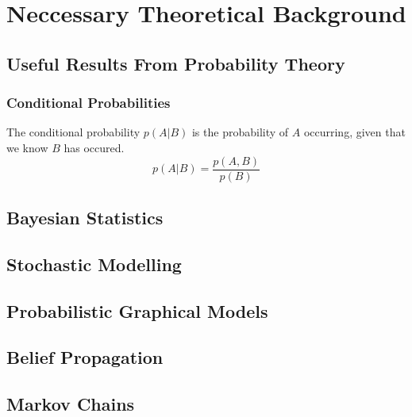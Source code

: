 \chapter{Neccessary Theoretical Background}

\section{Useful Results From Probability Theory}


 
\subsection{Conditional Probabilities}
The conditional probability $p(A | B)$ is the probability of $A$ occurring, given that we know $B$ has occured. 
\begin{equation}
    p(A | B) = \frac{p(A, B)}{p(B)}
\end{equation}



\section{Bayesian Statistics}

\section{Stochastic Modelling}

\section{Probabilistic Graphical Models}

\section{Belief Propagation}

\section{Markov Chains}

